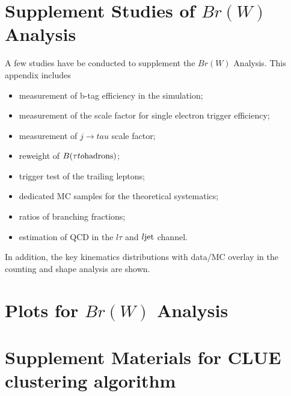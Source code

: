 \chapter{Supplement Studies of $Br(W)$ Analysis}

A few studies have be conducted to supplement the $Br(W)$ Analysis.
This appendix includes 
\begin{itemize}
    \item measurement of b-tag efficiency in the simulation;
    \item measurement of the scale factor for single electron trigger efficiency;
    \item measurement of $j \to tau$ scale factor;
    \item reweight of $B(\tau \to  \rm{hadrons})$;
    \item trigger test of the trailing leptons;
    \item dedicated MC samples for the \ttbar theoretical systematics;
    \item ratios of branching fractions;
    \item estimation of QCD in the $l\tau$ and $l\rm{jet}$ channel. 
\end{itemize}

\noindent In addition, the key kinematics distributions with 
data/MC overlay in the counting and shape analysis are shown.








% 





\chapter{Plots for $Br(W)$ Analysis}
% 




\chapter{Supplement Materials for CLUE clustering algorithm}

